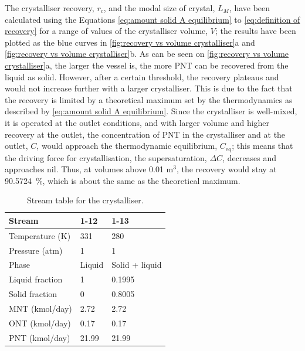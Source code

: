 \noindent The crystalliser recovery, $r_c$, and the modal size of crystal, $L_M$, have been calculated using the Equations \ref{eq:amount solid A equilibrium} to \ref{eq:definition of recovery} for a range of values of the crystalliser volume, $V$; the results have been plotted as the blue curves in \cref{fig:recovery vs volume crystalliser}a and \cref{fig:recovery vs volume crystalliser}b. As can be seen on \cref{fig:recovery vs volume crystalliser}a, the larger the vessel is, the more PNT can be recovered from the liquid as solid. However, after a certain threshold, the recovery plateaus and would not increase further with a larger crystalliser. This is due to the fact that the recovery is limited by a theoretical maximum set by the thermodynamics as described by \cref{eq:amount solid A equilibrium}. Since the crystalliser is well-mixed, it is operated at the outlet conditions, and with larger volume and higher recovery at the outlet, the concentration of PNT in the crystalliser and at the outlet, $C$, would approach the thermodynamic equilibrium, $C_{\mathrm{eq}}$; this means that the driving force for crystallisation, the supersaturation, $\Delta C$, decreases and approaches nil. Thus, at volumes above 0.01 m$^{3}$, the recovery would stay at \SI{90.5724}{\percent}, which is about the same as the theoretical maximum.

\begin{table}
\centering
\caption{Stream table for the crystalliser.}
\label{tab:crystalliser stream table}
\begin{tabular}{@{}l|l|l@{}}
\toprule
Stream                  &    1-12  &  1-13 \\ \midrule
Temperature (K)   &    331      & 280 \\ \midrule
Pressure (atm)   &      1    &  1 \\ \midrule
Phase               &   Liquid    & Solid + liquid \\ \midrule
Liquid fraction       &   1       & 0.1995 \\ \midrule
Solid fraction         &  0        & 0.8005 \\ \midrule
MNT (kmol/day)          &  2.72        & 2.72 \\ \midrule
ONT (kmol/day)        &    0.17      & 0.17 \\ \midrule
PNT (kmol/day)          &    21.99      & 21.99 \\ \bottomrule
\end{tabular}
\end{table}

